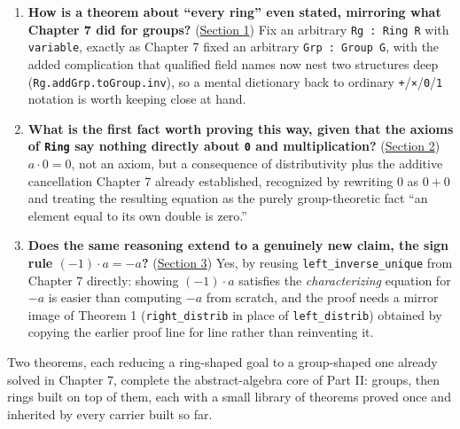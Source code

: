 \begin{enumerate}
\def\labelenumi{\arabic{enumi}.}
\tightlist
\item
  \textbf{How is a theorem about ``every ring'' even stated, mirroring what Chapter 7 did for groups?} (\hyperref[sec:09-ring-theorems:01-setup:1]{Section 1}) Fix an arbitrary \texttt{Rg : Ring R} with \texttt{variable}, exactly as Chapter 7 fixed an arbitrary \texttt{Grp : Group G}, with the added complication that qualified field names now nest two structures deep (\texttt{Rg.addGrp.toGroup.inv}), so a mental dictionary back to ordinary \texttt{+}/\texttt{×}/\texttt{0}/\texttt{1} notation is worth keeping close at hand.
\item
  \textbf{What is the first fact worth proving this way, given that the axioms of \texttt{Ring} say nothing directly about \texttt{0} and multiplication?} (\hyperref[sec:09-ring-theorems:02-theorem-1:1]{Section 2}) \(a \cdot 0 = 0\), not an axiom, but a consequence of distributivity plus the additive cancellation Chapter 7 already established, recognized by rewriting \(0\) as \(0+0\) and treating the resulting equation as the purely group-theoretic fact ``an element equal to its own double is zero.''
\item
  \textbf{Does the same reasoning extend to a genuinely new claim, the sign rule \((-1)\cdot a = -a\)?} (\hyperref[sec:09-ring-theorems:03-theorem-2:1]{Section 3}) Yes, by reusing \texttt{left\_\allowbreak{}inverse\_\allowbreak{}unique} from Chapter 7 directly: showing \((-1)\cdot a\) satisfies the \emph{characterizing} equation for \(-a\) is easier than computing \(-a\) from scratch, and the proof needs a mirror image of Theorem 1 (\texttt{right\_\allowbreak{}distrib} in place of \texttt{left\_\allowbreak{}distrib}) obtained by copying the earlier proof line for line rather than reinventing it.
\end{enumerate}

Two theorems, each reducing a ring-shaped goal to a group-shaped one already solved in Chapter 7, complete the abstract-algebra core of Part II: groups, then rings built on top of them, each with a small library of theorems proved once and inherited by every carrier built so far.






